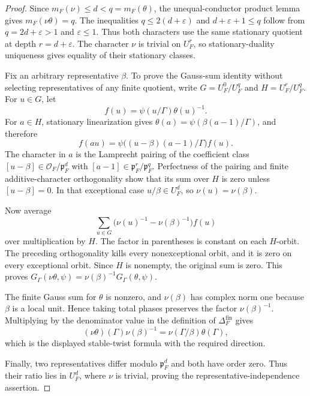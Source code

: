\begin{proof}
Since $m_F(\nu)\leq d<q=m_F(\theta)$, the unequal-conductor product lemma
gives $m_F(\nu\theta)=q$.  The inequalities
$q\leq2(d+\varepsilon)$ and $d+\varepsilon+1\leq q$ follow from
$q=2d+\varepsilon>1$ and $\varepsilon\leq1$.  Thus both characters use the
same stationary quotient at depth $r=d+\varepsilon$.  The character $\nu$
is trivial on $U_F^r$, so stationary-duality uniqueness gives equality of
their stationary classes.

Fix an arbitrary representative $\beta$.  To prove the Gauss-sum identity
without selecting representatives of any finite quotient, write
$G=U_F^0/U_F^q$ and $H=U_F^r/U_F^q$.  For $u\in G$, let
\[
 f(u)=\psi(u/\Gamma)\theta(u)^{-1}.
\]
For $a\in H$, stationary linearization gives
$\theta(a)=\psi(\beta(a-1)/\Gamma)$, and therefore
\[
 f(au)
 =\psi\bigl((u-\beta)(a-1)/\Gamma\bigr)f(u).
\]
The character in $a$ is the Lamprecht pairing of the coefficient class
$[u-\beta]\in\mathcal O_F/\mathfrak p_F^d$ with
$[a-1]\in\mathfrak p_F^r/\mathfrak p_F^q$.  Perfectness of the pairing and
finite additive-character orthogonality show that its sum over $H$ is zero
unless $[u-\beta]=0$.  In that exceptional case
$u/\beta\in U_F^d$, so $\nu(u)=\nu(\beta)$.

Now average
\[
 \sum_{u\in G}
 \bigl(\nu(u)^{-1}-\nu(\beta)^{-1}\bigr)f(u)
\]
over multiplication by $H$.  The factor in parentheses is constant on each
$H$-orbit.  The preceding orthogonality kills every nonexceptional orbit,
and it is zero on every exceptional orbit.  Since $H$ is nonempty, the
original sum is zero.  This proves
$G_\Gamma(\nu\theta,\psi)=\nu(\beta)^{-1}G_\Gamma(\theta,\psi)$.

The finite Gauss sum for $\theta$ is nonzero, and $\nu(\beta)$ has complex
norm one because $\beta$ is a local unit.  Hence taking total phases preserves
the factor $\nu(\beta)^{-1}$.  Multiplying by the denominator value in the
definition of $\Delta_F^{\mathrm{fin}}$ gives
\[
 (\nu\theta)(\Gamma)\nu(\beta)^{-1}
 =\nu(\Gamma/\beta)\theta(\Gamma),
\]
which is the displayed stable-twist formula with the required direction.

Finally, two representatives differ modulo $\mathfrak p_F^d$ and both have
order zero.  Thus their ratio lies in $U_F^d$, where $\nu$ is trivial, proving
the representative-independence assertion.
\end{proof}
